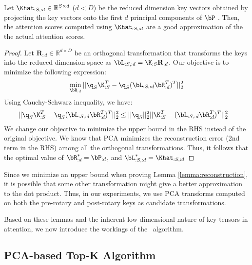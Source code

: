 \begin{lemma}
  Let $\Khat_{:S,:d} \in \mathbb{R}^{S\times d}$ ($d < D$) be the reduced dimension key vectors 
  obtained by projecting the key vectors onto the first $d$ principal components of $\bP$ . 
  Then, the attention scores computed using $\Khat_{:S,:d}$ are a good approximation of the
  the actual attention scores.
  \label{lemma:reconstruction}
\end{lemma}
\vspace{-0.2in}
\begin{proof}
  Let $\textbf{R}_{:d} \in \mathbb{R}^{d \times D}$ be an orthogonal transformation 
  that transforms the keys into the reduced dimension space as $\bL_{:S,:d} = \K_{:S}\textbf{R}_{:d}$. 
  Our objective is to minimize the following expression:
  \begin{align}
    \min_{\bR_{:d}}||\q_S\K_{:S}^{T} - \q_{S}(\bL_{:S,:d}\bR_{:d}^{T})^{T}||_2^2
  \end{align}
  Using Cauchy-Schwarz inequality, we have:
  \begin{align}
    ||\q_S\K_{:S}^{T} - \q_S(\bL_{:S,:d}\bR_{:d}^{T})^{T}||_2^2 &\leq ||\q_S||_2^2||\K_{:S}^{T} - (\bL_{:S,:d}\bR_{:d}^{T})^{T}||_2^2
  \end{align}
  We change our objective to minimize the upper bound in the RHS instead of the original objective. 
  We know that PCA minimizes the reconstruction error (2nd term in the RHS) among all 
  the orthogonal transformations. Thus, it follows that the optimal value of $\bR^{*}_{:d} = \bP_{:d}$, and 
  $\bL^{*}_{:S,:d}=\Khat_{:S,:d}$
\end{proof}

Since we minimize an upper bound when proving Lemma \ref{lemma:reconstruction},
it is possible that some other transformation might give a better approximation
to the dot product. Thus, in our experiments, we use PCA transforms computed on
both the pre-rotary and post-rotary keys as candidate transformations.

Based on these lemmas and the inherent low-dimensional nature of key tensors in
attention, we now introduce the workings of the \method~algorithm. 

\subsection{PCA-based Top-K Algorithm}

